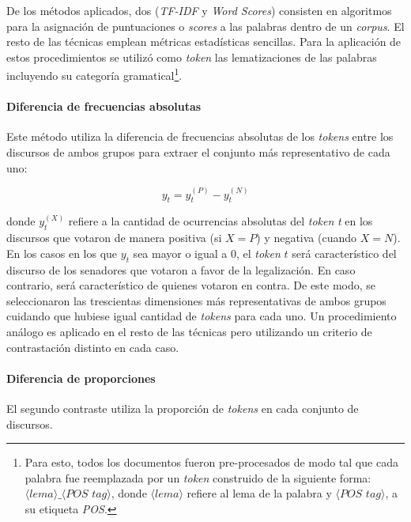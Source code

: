 De los m\'etodos aplicados, dos (\textit{TF-IDF} y \textit{Word Scores}) consisten
en algoritmos para la asignaci\'on de puntuaciones o \textit{scores} a las
palabras dentro de un \textit{corpus}. El resto de las t\'ecnicas emplean
m\'etricas estad\'isticas sencillas. Para la aplicaci\'on de estos procedimientos
se utiliz\'o como \textit{token} las lematizaciones de las palabras incluyendo
su categor\'ia gramatical\footnote{Para esto, todos los documentos fueron
pre-procesados de modo tal que cada palabra fue reemplazada por un
\textit{token} construido de la siguiente forma:
$\langle lema \rangle\_ \langle \textit{POS tag} \rangle$, donde
$\langle lema \rangle$ refiere al lema de la palabra y
$\langle \textit{POS tag} \rangle$, a su etiqueta \textit{POS}.}.


\paragraph{Diferencia de frecuencias absolutas}
\label{paragraph-methods-freq-abs}
Este m\'etodo utiliza la diferencia de frecuencias absolutas de los \textit{tokens} entre
los discursos de ambos grupos para extraer el conjunto m\'as representativo de
cada uno:

\begin{equation}
y_t = y_{t}^{(P)}-y_{t}^{(N)}
\end{equation}

donde $y_{t}^{(X)}$ refiere a la cantidad de ocurrencias absolutas del \textit{token}
\textit{t} en los discursos que votaron de manera positiva
(si $X=P$) y negativa (cuando $X=N$).
En los casos en los que $y_{t}$ sea mayor o igual a $0$, el \textit{token} $t$
ser\'a caracter\'istico del discurso de los senadores que votaron a favor de
la legalizaci\'on. En caso contrario, ser\'a caracter\'istico de quienes votaron
en contra.
De este modo, se seleccionaron las trescientas dimensiones m\'as representativas de
ambos grupos cuidando que hubiese igual cantidad de \textit{tokens} para cada uno.
Un procedimiento an\'alogo es aplicado en el resto de las t\'ecnicas pero utilizando
un criterio de contrastaci\'on distinto en cada caso.

\paragraph{Diferencia de proporciones}
\label{paragraph-methods-proportions}
El segundo contraste utiliza la proporci\'on de \textit{tokens}
en cada conjunto de discursos.

